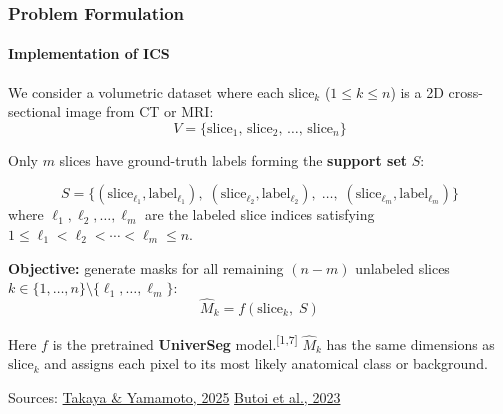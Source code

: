 \documentclass[nometaot,lecture,amberg,toc=twocolumn,indicatelastpageofframe,footlinebox]{OTHAWbeamer}
\begin{document}
\begin{frame}[t, label=method5b]
    \frametitle{Problem Formulation}
    \framesubtitle{Implementation of ICS }
    \vspace{-0.1cm}
    We consider a volumetric dataset where each $\text{slice}_k$
    ($1 \le k \le n$) is a 2D cross-sectional image from CT or MRI:
    \[
        V = \{\text{slice}_1,\, \text{slice}_2,\, \ldots,\, \text{slice}_n\}
    \]

    Only $m$ slices have ground-truth labels forming the
    \textcolor{orange1}{\textbf{support set}} $S$:
    \vspace{-0.1cm}  

    \[
        S = \bigl\{(\text{slice}_{\ell_1}, \text{label}_{\ell_1}),\;
                   (\text{slice}_{\ell_2}, \text{label}_{\ell_2}),\;
                   \ldots,\;
                   (\text{slice}_{\ell_m}, \text{label}_{\ell_m})\bigr\}
    \]
    \vspace{-0.1cm}
    where $\ell_1, \ell_2, \ldots, \ell_m$ are the labeled slice indices satisfying
    $1 \le \ell_1 < \ell_2 < \cdots < \ell_m \le n$.

    \vspace{0.3em}

    \textbf{Objective:} generate masks for all remaining $(n - m)$ unlabeled slices
    $k \in \{1,\ldots,n\} \setminus \{\ell_1,\ldots,\ell_m\}$:
    \[
        \hat{M}_k = f\!\left(\text{slice}_k,\; S\right)
    \]

    Here $f$ is the pretrained \textcolor{orange1}{\textbf{UniverSeg}} model.\textsuperscript{[1,7]}
    $\hat{M}_k$ has the same dimensions as $\text{slice}_k$ and assigns each pixel
    to its most likely anatomical class or background.

    \vspace{0.3em}
    {\tiny\textcolor{grau2}{Sources: \href{https://arxiv.org/abs/2412.13299}{Takaya \& Yamamoto, 2025} \quad \href{https://universeg.csail.mit.edu/}{Butoi et al., 2023}}}

\end{frame}

\end{document}
